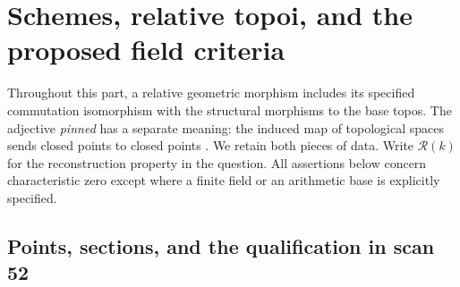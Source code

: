 \section{Schemes, relative topoi, and the proposed field criteria}
\label{sec:FF}

Throughout this part, a relative geometric morphism includes its specified
commutation isomorphism with the structural morphisms to the base topos.
The adjective \emph{pinned} has a separate meaning: the induced map of
topological spaces sends closed points to closed points
\citep[Definition~2.19]{FF_CHW2024}. We retain both pieces of data.
Write \(\mathcal R(k)\) for the reconstruction property in the question.
All assertions below concern characteristic zero except where a
finite field or an arithmetic base is explicitly specified.

\subsection{Points, sections, and the qualification in scan 52}

